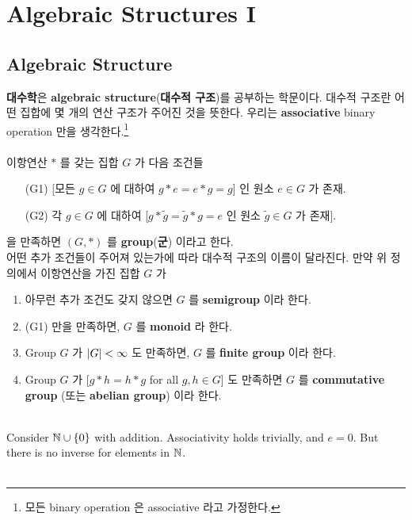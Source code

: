 \section{Algebraic Structures I}
\subsection{Algebraic Structure}
\textbf{대수학}은 \textbf{algebraic structure}(\textbf{대수적 구조})를 공부하는 학문이다. 대수적 구조란 어떤 집합에 몇 개의 연산 구조가 주어진 것을 뜻한다. 우리는 \textbf{associative} binary operation 만을 생각한다.\footnote{모든 binary operation 은 associative 라고 가정한다.}\\
\\
 이항연산 $\ast$ 를 갖는 집합 $G$ 가 다음 조건들
\begin{enumerate}
	\item[\sffamily (G1)] [모든 $g\in G$ 에 대하여 $g\ast e=e\ast g = g$] 인 원소 $e\in G$ 가 존재.
	\item[\sffamily (G2)] 각 $g \in G$ 에 대하여 [$g\ast \tilde{g} = \tilde{g}\ast g = e$ 인 원소 $\tilde{g}\in G$ 가 존재].
\end{enumerate}
을 만족하면 $(G, \ast)$ 를 \textbf{group}(\textbf{군}) 이라고 한다.\\

어떤 추가 조건들이 주어져 있는가에 따라 대수적 구조의 이름이 달라진다. 만약 위 정의에서 이항연산을 가진 집합 $G$ 가
\begin{enumerate}
	\item 아무런 추가 조건도 갖지 않으면 $G$ 를 \textbf{semigroup} 이라 한다.
	\item {\sffamily (G1)} 만을 만족하면, $G$ 를 \textbf{monoid} 라 한다.
	\item Group $G$ 가 $\left|G\right|<\infty$ 도 만족하면, $G$ 를 \textbf{finite group} 이라 한다.
	\item Group $G$ 가 [$g\ast h = h\ast g$ for all $g, h\in G$] 도 만족하면 $G$ 를 \textbf{commutative group} (또는 \textbf{abelian group}) 이라 한다.
\end{enumerate}~
\\
 Consider $\mathbb{N} \cup \{0\}$ with addition. Associativity holds trivially, and $e = 0$. But there is no inverse for elements in $\mathbb{N}$.\\
\\
